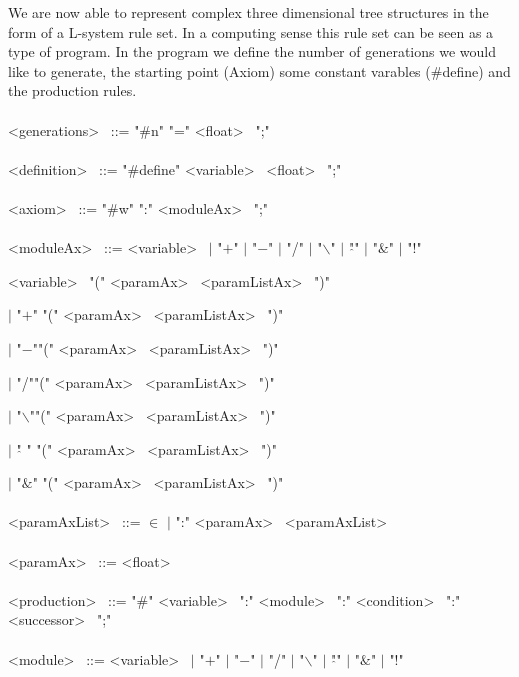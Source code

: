 We are now able to represent complex three dimensional tree structures in the form of a L-system rule set. In a computing sense this rule set can be seen as a type of program. In the program we define the number of generations we would like to generate, the starting point (Axiom) some constant varables (\#define) and the production rules. \\
\\
\textless generations\textgreater~ ::= "\#n" "=" \textless float\textgreater~ ";" \\
\\
\textless definition\textgreater~ ::=  "\#define" \textless variable\textgreater~ \textless float\textgreater~ ";" \\
\\
\textless axiom\textgreater~ ::=  "\#w" ":" \textless moduleAx\textgreater~ ";" \\
\\
\textless moduleAx\textgreater~  ::= \textless variable\textgreater~ $|$ "$+$" $|$ "$-$" $|$ "/" $|$ "$\backslash$" $|$ "$\hat{}$" $|$ "$\&$" $|$ "!" 

\hspace{2cm} \textless variable\textgreater~ "("  \textless paramAx\textgreater~ \textless paramListAx\textgreater~ ")"

\hspace{2cm} $|$ "$+$" "("  \textless paramAx\textgreater~ \textless paramListAx\textgreater~ ")" 

\hspace{2cm} $|$ "$-$""("  \textless paramAx\textgreater~ \textless paramListAx\textgreater~ ")" 

\hspace{2cm} $|$ "/""("  \textless paramAx\textgreater~ \textless paramListAx\textgreater~ ")" 

\hspace{2cm} $|$ "$\backslash$""("  \textless paramAx\textgreater~ \textless paramListAx\textgreater~ ")" 

\hspace{2cm} $|$ "$\hat{}$ " "("  \textless paramAx\textgreater~ \textless paramListAx\textgreater~ ")" 

\hspace{2cm} $|$ "$\&$" "("  \textless paramAx\textgreater~ \textless paramListAx\textgreater~ ")" \\
\\
\textless paramAxList\textgreater~ ::=  $\in$ $|$ ":" \textless paramAx\textgreater~ \textless paramAxList\textgreater~ \\
\\
\textless paramAx\textgreater~ ::= \textless float\textgreater~ \\
\\
\textless production\textgreater~ ::=  "\#" \textless variable\textgreater~  ":" \textless module\textgreater~ ":" \textless condition\textgreater~  ":" \textless successor\textgreater~ ";"\\
\\
\textless module\textgreater~ ::=  \textless variable\textgreater~ $|$ "$+$" $|$ "$-$" $|$ "/" $|$ "$\backslash$" $|$ "$\hat{}$" $|$ "$\&$" $|$ "!" 

